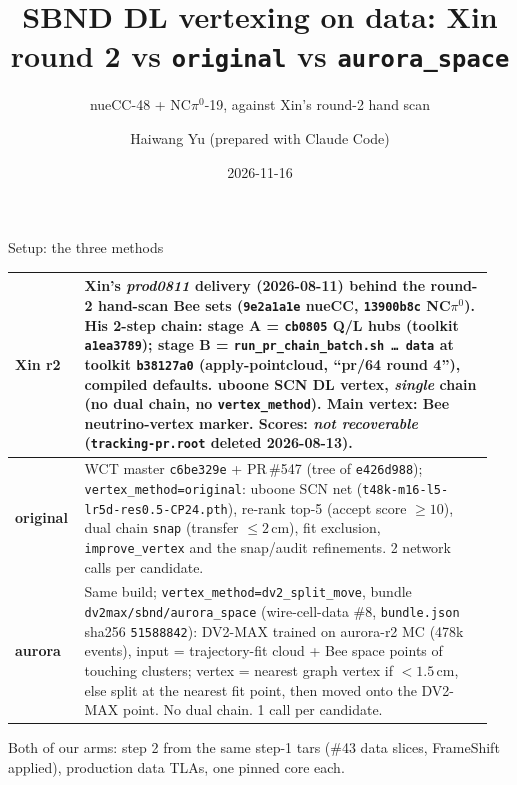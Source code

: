 \documentclass[aspectratio=169,10pt]{beamer}
\title{SBND DL vertexing on data: Xin round 2 vs \texttt{original} vs \texttt{aurora\_space}}
\subtitle{nueCC-48 + NC$\pi^0$-19, against Xin's round-2 hand scan}
\author{Haiwang Yu (prepared with Claude Code)}
\date{2026-11-16}
\begin{document}
\frame{\titlepage}

\begin{frame}{Setup: the three methods}
\small
\begin{tabular}{>{\raggedright\arraybackslash}p{0.13\linewidth}>{\raggedright\arraybackslash}p{0.82\linewidth}}
\toprule
\textbf{Xin r2} & Xin's \emph{prod0811} delivery (2026-08-11) behind the round-2 hand-scan Bee sets (\texttt{9e2a1a1e} nueCC, \texttt{13900b8c} NC$\pi^0$).
His 2-step chain: stage A = \texttt{cb0805} Q/L hubs (toolkit \texttt{a1ea3789}); stage B = \texttt{run\_pr\_chain\_batch.sh \ldots{} data} at toolkit \texttt{b38127a0}
(apply-pointcloud, ``pr/64 round 4''), compiled defaults. uboone SCN DL vertex, \emph{single} chain (no dual chain, no \texttt{vertex\_method}).
Main vertex: Bee neutrino-vertex marker. Scores: \emph{not recoverable} (\texttt{tracking-pr.root} deleted 2026-08-13). \\
\midrule
\textbf{original} & WCT master \texttt{c6be329e} + PR\,\#547 (tree of \texttt{e426d988}); \texttt{vertex\_method=original}: uboone SCN net
(\texttt{t48k-m16-l5-lr5d-res0.5-CP24.pth}), re-rank top-5 (accept score $\ge 10$), dual chain \texttt{snap} (transfer $\le 2$\,cm), fit exclusion,
\texttt{improve\_vertex} and the snap/audit refinements. 2 network calls per candidate. \\
\midrule
\textbf{aurora} & Same build; \texttt{vertex\_method=dv2\_split\_move}, bundle \texttt{dv2max/sbnd/aurora\_space} (wire-cell-data \#8, \texttt{bundle.json} sha256 \texttt{51588842}):
DV2-MAX trained on aurora-r2 MC (478k events), input = trajectory-fit cloud + Bee space points of touching clusters; vertex = nearest graph vertex if
$<1.5$\,cm, else split at the nearest fit point, then moved onto the DV2-MAX point. No dual chain. 1 call per candidate. \\
\bottomrule
\end{tabular}

\medskip
Both of our arms: step 2 from the same step-1 tars (\#43 data slices, FrameShift applied), production data TLAs, one pinned core each.
\end{frame}
\end{document}
